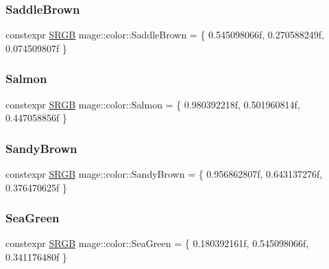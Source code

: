 \hypertarget{namespacemage_1_1color_ad240ed02994f05630bf98fdc63965b2d}{}\label{namespacemage_1_1color_ad240ed02994f05630bf98fdc63965b2d} 
\subsubsection{\texorpdfstring{Saddle\+Brown}{SaddleBrown}}
{\footnotesize\ttfamily constexpr \hyperlink{structmage_1_1_s_r_g_b}{S\+R\+GB} mage\+::color\+::\+Saddle\+Brown = \{ 0.\+545098066f, 0.\+270588249f, 0.\+074509807f \}}

\hypertarget{namespacemage_1_1color_aed2febf825b068fe2e584c6df453caf9}{}\label{namespacemage_1_1color_aed2febf825b068fe2e584c6df453caf9} 
\subsubsection{\texorpdfstring{Salmon}{Salmon}}
{\footnotesize\ttfamily constexpr \hyperlink{structmage_1_1_s_r_g_b}{S\+R\+GB} mage\+::color\+::\+Salmon = \{ 0.\+980392218f, 0.\+501960814f, 0.\+447058856f \}}

\hypertarget{namespacemage_1_1color_ad642cf958318eb8780e278a7620252b9}{}\label{namespacemage_1_1color_ad642cf958318eb8780e278a7620252b9} 
\subsubsection{\texorpdfstring{Sandy\+Brown}{SandyBrown}}
{\footnotesize\ttfamily constexpr \hyperlink{structmage_1_1_s_r_g_b}{S\+R\+GB} mage\+::color\+::\+Sandy\+Brown = \{ 0.\+956862807f, 0.\+643137276f, 0.\+376470625f \}}

\hypertarget{namespacemage_1_1color_a08a9dd84d3682c032af641e4eb2de2dc}{}\label{namespacemage_1_1color_a08a9dd84d3682c032af641e4eb2de2dc} 
\subsubsection{\texorpdfstring{Sea\+Green}{SeaGreen}}
{\footnotesize\ttfamily constexpr \hyperlink{structmage_1_1_s_r_g_b}{S\+R\+GB} mage\+::color\+::\+Sea\+Green = \{ 0.\+180392161f, 0.\+545098066f, 0.\+341176480f \}}

